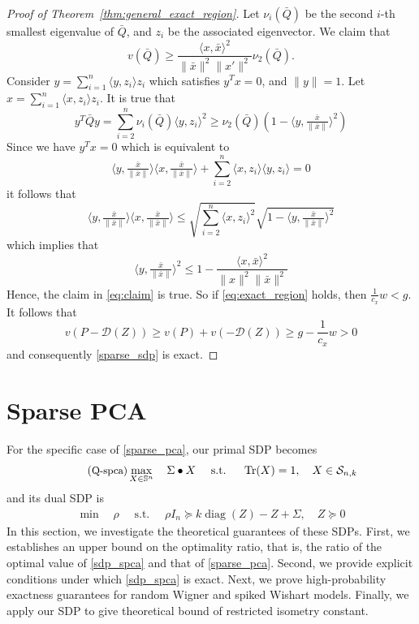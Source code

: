 \documentclass[11pt]{amsart}
\newcommand{\Szero}[2]{\ensuremath{\mathcal{S}_{#1,#2}}}
\theoremstyle{plain}
\theoremstyle{definition}
\theoremstyle{remark}
\newcommand{\cD}{{\mathcal{D}}}
\DeclareMathOperator{\diag}{diag}
\DeclareMathOperator{\tr}{Tr}
\begin{document}
\begin{proof}[Proof of Theorem~\ref{thm:general_exact_region}]
        Let \(\nu_i(\bar Q)\) be the second \(i\)-th smallest eigenvalue of \(\bar Q\), and \(z_i\) be the associated eigenvector. We claim that 
        \begin{equation}\label{eq:claim}
        v(\bar Q) \geq \frac{\langle x, \bar x\rangle^2}{\|\bar x\|^2\|x'\|^2} \nu_2(\bar Q).
        \end{equation}
        Consider \(y = \sum_{i=1}^n \langle y,z_i\rangle z_i\) which satisfies \(y^T x = 0\), and \(\|y\|=1\). Let \(x = \sum_{i=1}^n \langle x,z_i\rangle z_i\). It is true that
        \[
        y^T \bar Q y = \sum_{i=2}^n \nu_i(\bar Q) \langle y,z_i\rangle^2 \geq \nu_2(\bar Q) (1 - \langle y,\tfrac{\bar x}{\|\bar x\|}\rangle^2)
        \]
        Since we have \(y^Tx=0\) which is equivalent to 
        \[
         \langle y,\tfrac{\bar x}{\|\bar x\|} \rangle \langle x,\tfrac{\bar x}{\|\bar x\|} \rangle + \sum_{i=2}^n \langle x,z_i \rangle  \langle y,z_i \rangle = 0
        \]
        it follows that
        \[
         \langle y,\tfrac{\bar x}{\|\bar x\|} \rangle \langle x,\tfrac{\bar x}{\|\bar x\|} \rangle \leq \sqrt{\textstyle\sum_{i=2}^n  \langle x,z_i \rangle^2} \sqrt{1 - \langle y,\tfrac{\bar x}{\|\bar x\|} \rangle^2}
        \]
        which implies that
        \[
        \langle y,\tfrac{\bar x}{\|\bar x\|} \rangle^2\leq 1 - \frac{\langle x,\bar x \rangle^2}{\|x\|^2\|\bar x\|^2}
        \]
        Hence, the claim in \eqref{eq:claim} is true. 
        So if \eqref{eq:exact_region} holds, then $\frac{1}{c_{x}}  w <  g$. It follows that
		\[
		v(P-\cD(Z)) \geq v(P) + v(-\cD(Z))\geq g -  \frac{1}{c_{x}}  w> 0
		\]
		and consequently \eqref{sparse_sdp} is exact. 
	\end{proof}
	
	
	\section{Sparse PCA}\label{section:spca}
	
	For the specific case of \eqref{sparse_pca},
	our primal SDP becomes
	\begin{equation}\label{sdp_spca}
		\tag{\small{Q-spca}}
		\max_{X\in\mathbb{S}^n} \quad  \Sigma \bullet X
		\quad\text{ s.t. }\quad \tr(X)= 1, \quad
		X \in \Szero{n}{k}
	\end{equation}
	and its dual SDP is
	\begin{equation}\label{sdp_spca_dual}
		\tag{D-spca}
		\begin{aligned}
			\min \quad \rho
			\quad\text{ s.t. }\quad
			\rho I_n \succeq  k\diag(Z) - Z + \Sigma,\quad
			Z \succeq 0
		\end{aligned}
	\end{equation}
	In this section, we investigate the theoretical guarantees of these SDPs.
	First, we establishes an upper bound on the optimality ratio, that is, the ratio of the optimal value of \eqref{sdp_spca} and that of \eqref{sparse_pca}.
	Second, we provide explicit conditions under which \eqref{sdp_spca} is exact.
	Next, we prove high-probability exactness guarantees for random Wigner and spiked Wishart models. Finally, we apply our SDP to give theoretical bound of restricted isometry constant.
	
\end{document}
